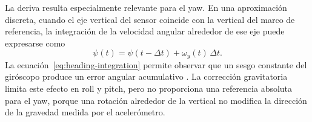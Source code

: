 La deriva resulta especialmente relevante para el yaw. En una aproximación discreta, cuando el
eje vertical del sensor coincide con la vertical del marco de referencia, la integración de la
velocidad angular alrededor de ese eje puede expresarse como
\begin{equation}
  \psi(t) = \psi(t-\Delta t) + \omega_y(t)\,\Delta t.
  \label{eq:heading-integration}
\end{equation}
La ecuación~\ref{eq:heading-integration} permite observar que un sesgo constante del giróscopo
produce un error angular acumulativo \cite{Woodman2007}. La corrección gravitatoria limita este
efecto en roll y pitch, pero no proporciona una referencia absoluta para el yaw, porque una
rotación alrededor de la vertical no modifica la dirección de la gravedad medida por el
acelerómetro.

